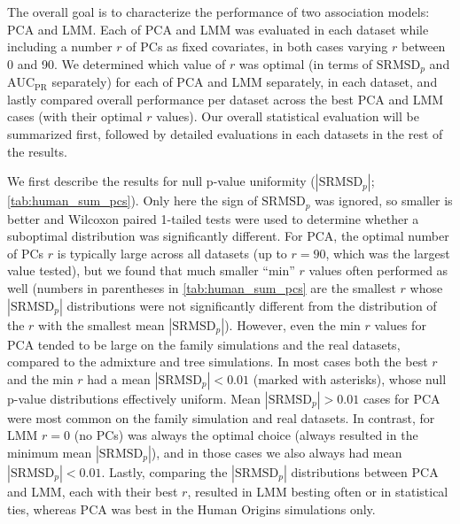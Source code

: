 \documentclass[11pt]{article}
\newcommand{\rmsd}{\text{SRMSD}_p}
\newcommand{\auc}{\text{AUC}_\text{PR}}
\begin{document}
The overall goal is to characterize the performance of two association models: PCA and LMM.
Each of PCA and LMM was evaluated in each dataset while including a number $r$ of PCs as fixed covariates, in both cases varying $r$ between 0 and 90.
We determined which value of $r$ was optimal (in terms of $\rmsd$ and $\auc$ separately) for each of PCA and LMM separately, in each dataset, and lastly compared overall performance per dataset across the best PCA and LMM cases (with their optimal $r$ values).
Our overall statistical evaluation will be summarized first, followed by detailed evaluations in each datasets in the rest of the results.

We first describe the results for null p-value uniformity ($|\rmsd|$; \cref{tab:human_sum_pcs}).
Only here the sign of $\rmsd$ was ignored, so smaller is better and Wilcoxon paired 1-tailed tests were used to determine whether a suboptimal distribution was significantly different.
For PCA, the optimal number of PCs $r$ is typically large across all datasets (up to $r=90$, which was the largest value tested), but we found that much smaller ``min'' $r$ values often performed as well (numbers in parentheses in \cref{tab:human_sum_pcs} are the smallest $r$ whose $|\rmsd|$ distributions were not significantly different from the distribution of the $r$ with the smallest mean $|\rmsd|$).
However, even the min $r$ values for PCA tended to be large on the family simulations and the real datasets, compared to the admixture and tree simulations.
In most cases both the best $r$ and the min $r$ had a mean $|\rmsd| < 0.01$ (marked with asterisks), whose null p-value distributions effectively uniform.
Mean $|\rmsd| > 0.01$ cases for PCA were most common on the family simulation and real datasets.
In contrast, for LMM $r=0$ (no PCs) was always the optimal choice (always resulted in the minimum mean $|\rmsd|$), and in those cases we also always had mean $|\rmsd| < 0.01$.
Lastly, comparing the $|\rmsd|$ distributions between PCA and LMM, each with their best $r$, resulted in LMM besting often or in statistical ties, whereas PCA was best in the Human Origins simulations only.
\end{document}
